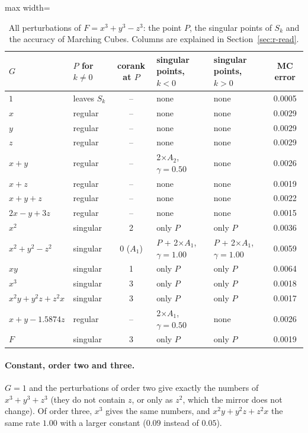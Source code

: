 \documentclass[12pt, a4paper]{article}
\theoremstyle{plain}
\theoremstyle{definition}
\theoremstyle{remark}
\theoremstyle{definition}
\begin{document}
\begin{table}[!h]
\centering
\footnotesize
\begin{adjustbox}{max width=\textwidth}
\begin{tabular}{l l c l l c}
\toprule
$G$ & $P$ for $k\neq0$ & corank at $P$ & singular points, $k<0$ & singular points, $k>0$ & MC error \\
\midrule
$1$ & leaves $S_k$ & -- & none & none & 0.0005 \\
$x$ & regular & -- & none & none & 0.0029 \\
$y$ & regular & -- & none & none & 0.0029 \\
$z$ & regular & -- & none & none & 0.0029 \\
$x+y$ & regular & -- & 2$\times$$A_2$, $\gamma=0.50$ & none & 0.0026 \\
$x+z$ & regular & -- & none & none & 0.0019 \\
$x+y+z$ & regular & -- & none & none & 0.0022 \\
$2x-y+3z$ & regular & -- & none & none & 0.0015 \\
$x^2$ & singular & 2 & only $P$ & only $P$ & 0.0036 \\
$x^2+y^2-z^2$ & singular & 0 ($A_1$) & $P$ + 2$\times$$A_1$, $\gamma=1.00$ & $P$ + 2$\times$$A_1$, $\gamma=1.00$ & 0.0059 \\
$xy$ & singular & 1 & only $P$ & only $P$ & 0.0064 \\
$x^3$ & singular & 3 & only $P$ & only $P$ & 0.0018 \\
$x^2y+y^2z+z^2x$ & singular & 3 & only $P$ & only $P$ & 0.0017 \\
$x+y-1.5874z$ & regular & -- & 2$\times$$A_1$, $\gamma=0.50$ & none & 0.0026 \\
$F$ & singular & 3 & only $P$ & only $P$ & 0.0019 \\
\bottomrule
\end{tabular}
\end{adjustbox}
\caption[Singular points for $x^3+y^3-z^3$]{All perturbations of $F=x^3+y^3-z^3$: the point $P$, the singular points of $S_k$ and the accuracy of Marching Cubes. Columns are explained in Section~\ref{sec:r-read}.}
\label{tab:r-E6b-points}
\end{table}
\paragraph{Constant, order two and three.} $G=1$ and the perturbations of order two
give exactly the numbers of $x^3+y^3+z^3$ (they do not contain $z$, or only as
$z^2$, which the mirror does not change). Of order three, $x^3$ gives the same
numbers, and $x^2y+y^2z+z^2x$ the same rate $1.00$ with a larger constant ($0.09$
instead of $0.05$).
\end{document}
